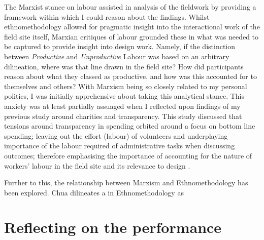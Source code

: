 The Marxist stance on labour assisted in analysis of the fieldwork by providing a framework within which I could reason about the findings. Whilst ethnomethodology allowed for pragmatic insight into the interactional work of the field site itself, Marxian critiques of labour grounded these in what was needed to be captured to provide insight into design work. Namely, if the distinction between \textit{Productive} and \textit{Unproductive} Labour was based on an arbitrary dilineation, where was that line drawn in the field site? How did participants reason about what they classed as productive, and how was this accounted for to themselves and others? With Marxism being so closely related to my personal politics, I was initially apprehensive about taking this analytical stance. This anxiety was at least partially assuaged when I reflected upon findings of my previous study around charities and transparency. This study discussed that tensions around transparency in spending orbited around a focus on bottom line spending; leaving out the effort (labour) of volunteers and underplaying importance of the labour required of administrative tasks when discussing outcomes; therefore emphasising the importance of accounting for the nature of workers' labour in the field site and its relevance to design \cite{marshall_accountable:_2016}.

Further to this, the relationship between Marxism and Ethnomethodology has been explored. Chua dilineates a  in Ethnomethodology as 











\section{Reflecting on the performance}

